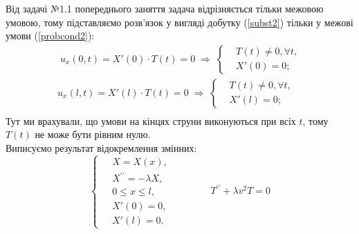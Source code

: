Від задачі №1.1 попереднього заняття задача відрізняється тільки межовою умовою, тому підставляємо розв'язок у вигляді добутку (\ref{subst2}) тільки у межові умови (\ref{probcond2}):
\begin{equation*}
    \begin{aligned}
        \;u_x(0,t) = X'(0) \cdot T(t) = 0
        \;\Rightarrow\;
        \left\{ \begin{aligned}
            &T(t) \neq 0, \forall t, \\  &X'(0) = 0; 
        \end{aligned} \right.\\
        u_x(l,t) = X'(l) \cdot T(t) = 0
        \;\Rightarrow\;
        \left\{ \begin{aligned}
            &T(t) \neq 0, \forall t, \\  &X'(l) = 0; 
        \end{aligned} \right.\\
    \end{aligned}
\end{equation*}
Тут ми врахували, що умови на кінцях струни виконуються при всіх $t$, тому $T(t)$ не може бути рівним нулю.\\

Виписуємо результат відокремлення змінних:
\begin{equation} \label{sepvar2}
    \left\{ \begin{aligned}
        \;&X = X(x), \\
          &X^{\prime\prime} = -\lambda X, \\
          &0 \leq x \leq l, \\
          &X'(0) = 0, \\ 
          &X'(l) = 0. 
    \end{aligned} \right.
    \qquad\qquad
    T^{\prime\prime} + \lambda v^2 T = 0
\end{equation}

